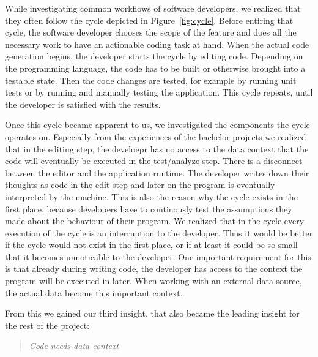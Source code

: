 While investigating common workflows of software developers, we realized that they often follow the cycle depicted in Figure~\ref{fig:cycle}. Before entiring that cycle, the software developer chooses the scope of the feature and does all the necessary work to have an actionable coding task at hand. When the actual code generation begins, the developer starts the cycle by editing code. Depending on the programming language, the code has to be built or otherwise brought into a testable state. Then the code changes are tested, for example by running unit tests or by running and manually testing the application. This cycle repeats, until the developer is satisfied with the results.

Once this cycle became apparent to us, we investigated the components the cycle operates on. Especially from the experiences of the bachelor projects we realized that in the editing step, the develoepr has no access to the data context that the code will eventually be executed in the test/analyze step. There is a disconnect between the editor and the application runtime. The developer writes down their thoughts as code in the edit step and later on the program is eventually interpreted by the machine. This is also the reason why the cycle exists in the first place, because developers have to continously test the assumptions they made about the behaviour of their program. We realized that in the cycle every execution of the cycle is an interruption to the developer. Thus it would be better if the cycle would not exist in the first place, or if at least it could be so small that it becomes unnoticable to the developer. One important requirement for this is that already during writing code, the developer has access to the context the program will be executed in later. When working with an external data source, the actual data become this important context.

From this we gained our third insight, that also became the leading insight for the rest of the project:

\begin{quote}
\emph{Code needs data context}
\end{quote}
